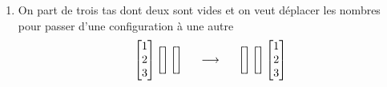 \begin{enumerate}
 \item On part de trois tas dont deux sont vides et on veut déplacer les nombres pour passer d'une configuration à une autre
 \begin{displaymath}
\begin{bmatrix}
1 \\ 2  \\ 3                                                                                                          
\end{bmatrix} 
\begin{bmatrix}
  \\   \\                                                                                                           
\end{bmatrix} 
\begin{bmatrix}
 \\   \\                                                                                                           
\end{bmatrix} 
  \hspace{0.5cm} \longrightarrow \hspace{0.5cm}
\begin{bmatrix}
  \\   \\                                                                                                           
\end{bmatrix} 
\begin{bmatrix}
 \\   \\                                                                                                           
\end{bmatrix} 
\begin{bmatrix}
1 \\ 2  \\ 3                                                                                                          
\end{bmatrix}   
 \end{displaymath}
 

\end{enumerate}
